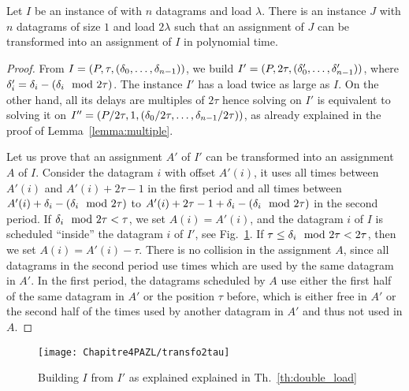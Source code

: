 \begin{theorem}\label{th:double_load}
Let $I$ be an instance of \pma with $n$ datagrams and load $\lambda$. There is an instance $J$ with $n$ datagrams of size $1$
and load $2\lambda$ such that an assignment of $J$ can be transformed into an assignment of $I$ in polynomial time.
\end{theorem}
\begin{proof}
From $I = (P,\tau,(\delta_{0},\dots,\delta_{n-1}))$, we build $I' = (P, 2\tau, (\delta_{0}',\dots,\delta_{n-1}'))$, where $\delta_i' = \delta_{i} - (\delta_{i} \mod 2\tau)$. The instance $I'$ has a load twice as large as $I$.
On the other hand, all its delays are multiples of $2\tau$ hence solving \pma on $I'$ is equivalent to solving it on $I'' = (P/2\tau, 1,(\delta_{0}/ 2\tau,\dots,\delta_{n-1} /2\tau))$, as already explained in the proof of Lemma~\ref{lemma:multiple}. 

Let us prove that an assignment $A'$ of $I'$ can be transformed into an assignment $A$ of $I$. 
Consider the datagram $i$ with offset $A'(i)$, it uses all times between $A'(i)$ and $A'(i) + 2\tau -1$ in the first period and all times between $A'(i) + \delta_{i} - (\delta_{i} \mod 2\tau)$ to $A'(i) + 2\tau -1+ \delta_{i} - (\delta_{i} \mod 2\tau)$ in the second period. 
If $\delta_{i} \mod 2\tau < \tau $, we set $A(i) = A'(i)$, and the datagram $i$ of $I$ is scheduled ``inside'' the 
datagram $i$ of $I'$, see Fig.~\ref{fig:transf_2tau}. If $\tau \leq \delta_{i} \mod 2\tau < 2\tau$, then we set 
$A(i) = A'(i) - \tau$. There is no collision in the assignment $A$, since all datagrams in the second period use
times which are used by the same datagram in $A'$. In the first period, the datagrams scheduled by $A$ use either the first
half of the same datagram in $A'$ or the position $\tau$ before, which is either free in $A'$ or the second half of the times used by another datagram in $A'$ and thus not used in $A$. 
\end{proof}
\begin{figure}[h]
\begin{center}

\texttt{[image: Chapitre4PAZL/transfo2tau]}
\end{center}
\caption{Building $I$ from $I'$ as explained explained in Th.~\ref{th:double_load}}
\label{fig:transf_2tau}
\end{figure}

